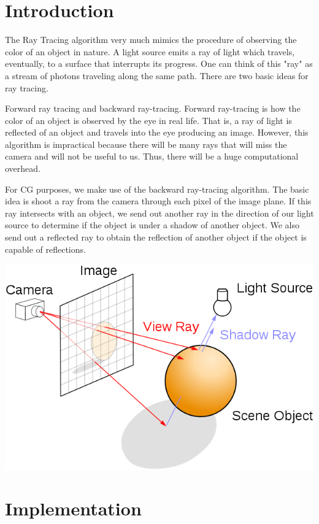 \documentclass[paper=a4, fontsize=11pt]{scrartcl}
\numberwithin{equation}{section}		%
\numberwithin{figure}{section}			%
\numberwithin{table}{section}				%
\begin{document}
\section{Introduction}
The Ray Tracing algorithm very much mimics the procedure of observing the color of an object in nature. A light source emits a ray of light which travels, eventually, to a surface that interrupts its progress. One can think of this "ray" as a stream of photons traveling along the same path. There are two basic ideas for ray tracing.
\par
Forward ray tracing and backward ray-tracing. Forward ray-tracing is how the color of an object is observed by the eye in real life. That is, a ray of light is reflected of an object and travels into the eye producing an image. However, this algorithm is impractical because there will be many rays that will miss the camera and will not be useful to us. Thus, there will be a huge computational overhead. 
\par
For CG purposes, we make use of the backward ray-tracing algorithm. The basic idea is shoot a ray from the camera through each pixel of the image plane. If this ray intersects with an object, we send out another ray in the direction of our light source to determine if the object is under a shadow of another object. We also send out a reflected ray to obtain the reflection of another object if the object is capable of reflections.
\vspace{20pt}
\begin{center}\includegraphics[width=\textwidth]{ray_tracing_wiki}\end{center}
\newpage
\section{Implementation}
\end{document}
